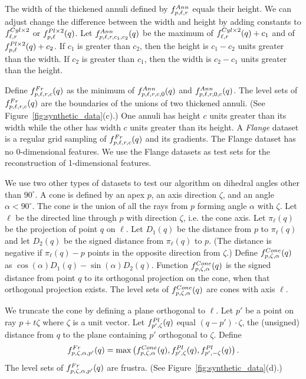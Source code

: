 The width of the thickened annuli defined by $f^{Ann}_{p,\ell,r}$
equals their height.
We can adjust change the difference between the width and height
by adding constants to $f^{Cyl \times 2}_{\ell,r}$ or $f^{Pl \times 2}_{p,\ell}(q)$.
Let $f^{Ann}_{p,\ell,r,c_1,c_2}(q)$ be the maximum 
of $f^{Cyl \times 2}_{\ell,r}(q)+c_1$ and of $f^{Pl \times 2}_{p,\ell}(q)+c_2$.
If $c_1$ is greater than $c_2$, 
then the height is $c_1-c_2$ units greater than the width.
If $c_2$ is greater than $c_1$, 
then the width is $c_2-c_1$ units greater than the height.

Define $f^{Fr}_{p,\ell,r,c}(q)$ as the minimum
of $f^{Ann}_{p,\ell,r,c,0}(q)$ and $f^{Ann}_{p,\ell,r,0,c}(q)$.
The level sets of $f^{Fr}_{p,\ell,r,c}(q)$ are the boundaries
of the unions of two thickened annuli.
(See Figure~\ref{fig:synthetic_data}(c).)
One annuli has height $c$ units greater than its width
while the other has width $c$ units greater than its height.
A {\em Flange} dataset is a regular grid sampling of $f^{Fr}_{p,\ell,r,c}(q)$
and its gradients.
The Flange dataset has no 0-dimensional features.
We use the Flange datasets as test sets
for the reconstruction of 1-dimensional features.

We use two other types of datasets to test our algorithm on dihedral
angles other than $90^\circ$.
A cone is defined by an apex $p$, an axis direction $\zeta$,
and an angle $\alpha < 90^\circ$.
The cone is the union of all the rays from $p$ forming angle $\alpha$
with $\zeta$.
Let $\ell$ be the directed line through $p$ with direction $\zeta$,
i.e. the cone axis.
Let $\pi_{\ell}(q)$ be the projection of point $q$ on $\ell$.
Let $D_1(q)$ be the distance from $p$ to $\pi_{\ell}(q)$
and let $D_2(q)$ be the signed distance from $\pi_{\ell}(q)$ to $p$.
(The distance is negative if $\pi_\ell(q)-p$ points in the opposite
direction from $\zeta$.)
Define $f^{Cone}_{p,\zeta,\alpha}(q)$ 
as $\cos(\alpha) D_1(q) - \sin(\alpha) D_2(q)$.
Function $f^{Cone}_{p,\zeta,\alpha}(q)$ is the signed distance
from point $q$ to its orthogonal projection on the cone,
when that orthogonal projection exists.
The level sets of $f^{Cone}_{p,\zeta,\alpha}(q)$ are cones
with axis $\ell$.

We truncate the cone by defining a plane orthogonal to $\ell$.
Let $p'$ be a point on ray $p+t\zeta$
where $\zeta$ is a unit vector.
Let $f^{Pl}_{p',\zeta}(q)$ equal $(q-p') \cdot \zeta$,
the (unsigned) distance from $q$ 
to the plane containing $p'$ orthogonal to $\zeta$.
Define
\begin{equation*}
f^{Fr}_{p,\zeta,\alpha,p'}(q) = 
\max \left ( f^{Cone}_{p,\zeta,\alpha}(q), f^{Pl}_{p',\zeta}(q), f^{Pl}_{p',-\zeta}(q)
\right ) .
\end{equation*}
The level sets of $f^{Fr}_{p,\zeta,\alpha,p'}(q)$ are frustra.
(See Figure~\ref{fig:synthetic_data}(d).)

